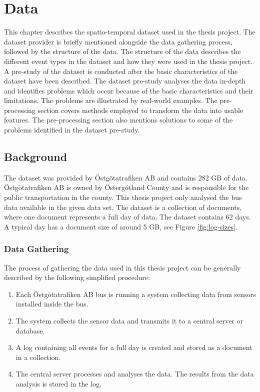 \chapter{Data}
\label{cha:data}

This chapter describes the spatio-temporal dataset used in the thesis project.
The dataset provider is briefly mentioned alongside the data gathering process, followed by the structure of the data.
The structure of the data describes the different event types in the dataset and how they were used in the thesis project.
A pre-study of the dataset is conducted after the basic characteristics of the dataset have been described.
The dataset pre-study analyses the data in-depth and identifies problems which occur because of the basic characteristics and their limitations.
The problems are illustrated by real-world examples.
The pre-processing section covers methods employed to transform the data into usable features.
The pre-processing section also mentions solutions to some of the problems identified in the dataset pre-study.

\section{Background}
The dataset was provided by Östgötatrafiken AB and contains 282 GB of data.
Östgötatrafiken AB is owned by Östergötland County and is responsible for the public transportation in the county.
This thesis project only analysed the bus data available in the given data set.
The dataset is a collection of documents, where one document represents a full day of data.
The dataset contains 62 days.
A typical day has a document size of around 5 GB, see Figure \ref{fig:log-sizes}.

\subsection{Data Gathering}
The process of gathering the data used in this thesis project can be generally described by the following simplified procedure:
\begin{enumerate}
    \item Each Östgötatrafiken AB bus is running a system collecting data from sensors installed inside the bus.
    \item The system collects the sensor data and transmits it to a central server or database.
    \item A log containing all events for a full day is created and stored as a document in a collection.
    \item The central server processes and analyses the data. The results from the data analysis is stored in the log.
\end{enumerate}


